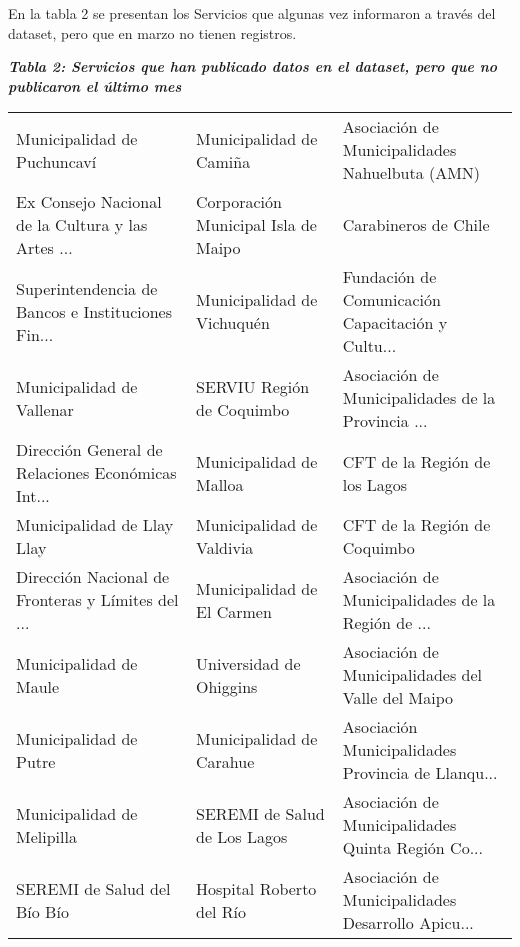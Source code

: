 \documentclass[11pt]{article}
\begin{document}
En la tabla 2 se presentan los Servicios que algunas vez informaron a
través del dataset, pero que en marzo no tienen registros.

    \textbf{\emph{Tabla 2: Servicios que han publicado datos en el dataset,
pero que no publicaron el último mes}}

    
    \begin{tabular}{ p{5cm} | p{5cm} | p{5cm} }
\toprule
                       Municipalidad de Puchuncaví &                            Municipalidad de Camiña &     Asociación de Municipalidades Nahuelbuta (AMN) \\
 Ex Consejo Nacional de la Cultura y las Artes ... &                Corporación Municipal Isla de Maipo &                               Carabineros de Chile \\
 Superintendencia de Bancos e Instituciones Fin... &                         Municipalidad de Vichuquén &  Fundación de Comunicación Capacitación y Cultu... \\
                         Municipalidad de Vallenar &                          SERVIU Región de Coquimbo &  Asociación de Municipalidades de la Provincia ... \\
 Dirección General de Relaciones Económicas Int... &                            Municipalidad de Malloa &                      CFT de la Región de los Lagos \\
                        Municipalidad de Llay Llay &                          Municipalidad de Valdivia &                       CFT de la Región de Coquimbo \\
 Dirección Nacional de Fronteras y Límites del ... &                         Municipalidad de El Carmen &  Asociación de Municipalidades de la Región de ... \\
                            Municipalidad de Maule &                            Universidad de Ohiggins &  Asociación de Municipalidades del Valle del Maipo \\
                            Municipalidad de Putre &                           Municipalidad de Carahue &  Asociación Municipalidades Provincia de Llanqu... \\
                        Municipalidad de Melipilla &                       SEREMI de Salud de Los Lagos &  Asociación de Municipalidades Quinta Región Co... \\
                       SEREMI de Salud del Bío Bío &                           Hospital Roberto del Río &  Asociación de Municipalidades Desarrollo Apicu... \\

\end{tabular}
\end{document}
